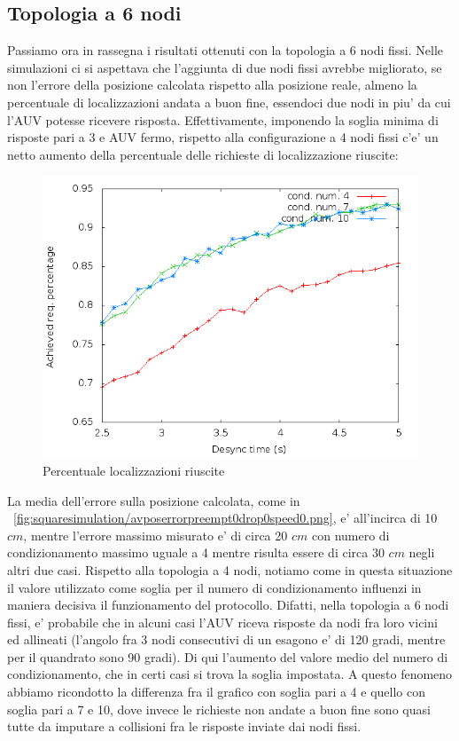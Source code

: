 \documentclass[Lau,binding=0.6cm]{sapthesis}
\begin{document}
\subsection{Topologia a 6 nodi}
Passiamo ora in rassegna i risultati ottenuti con la topologia a 6 nodi fissi.
Nelle simulazioni ci si aspettava che l'aggiunta di due nodi fissi avrebbe migliorato, se non l'errore della posizione calcolata rispetto alla posizione reale, almeno la percentuale di localizzazioni andata a buon fine, essendoci due nodi in piu' da cui l'AUV potesse ricevere risposta. Effettivamente, imponendo la soglia minima di risposte pari a 3 e AUV fermo, rispetto alla configurazione a 4 nodi fissi c'e' un netto aumento della percentuale delle richieste di localizzazione riuscite:
\begin{figure}[H]
    \centering
    \includegraphics[scale=0.5]{hexagonsimulation/achievedlocreq3preempt0drop0speed0.png}
    \caption{Percentuale localizzazioni riuscite}
    \label{fig:hexagonsimulation/achievedlocreq3preempt0drop0speed0}
\end{figure}
La media dell'errore sulla posizione calcolata, come in ~\ref{fig:squaresimulation/avposerrorpreempt0drop0speed0.png}, e' all'incirca di 10 $cm$, mentre l'errore massimo misurato e' di circa 20 $cm$ con numero di condizionamento massimo uguale a 4 mentre risulta essere di circa 30 $cm$ negli altri due casi.
Rispetto alla topologia a 4 nodi, notiamo come in questa situazione il valore utilizzato come soglia per il numero di condizionamento influenzi in maniera decisiva il funzionamento del protocollo. Difatti, nella topologia a 6 nodi fissi, e' probabile che in alcuni casi l'AUV riceva risposte da nodi fra loro vicini ed allineati (l'angolo fra 3 nodi consecutivi di un esagono e' di 120 gradi, mentre per il quandrato sono 90 gradi). Di qui l'aumento del valore medio del numero di condizionamento, che in certi casi si trova la soglia impostata. A questo fenomeno abbiamo ricondotto la differenza fra il grafico con soglia pari a 4 e quello con soglia pari a 7 e 10, dove invece le richieste non andate a buon fine sono quasi tutte da imputare a collisioni fra le risposte inviate dai nodi fissi.
\end{document}
